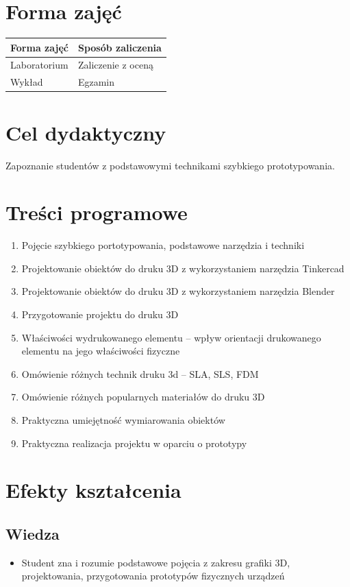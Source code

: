 \documentclass[12pt, a4paper]{article}
\begin{document}
\section{Forma zajęć}

\begin{tabular}{ll}
  \hline
  \textbf{Forma zajęć} & \textbf{Sposób zaliczenia} \\
  \hline
  Laboratorium & Zaliczenie z oceną \\
  Wykład & Egzamin \\
  \hline
\end{tabular}

\section{Cel dydaktyczny}

Zapoznanie studentów z podstawowymi technikami szybkiego prototypowania.

\section{Treści programowe}

\begin{enumerate}
  \item Pojęcie szybkiego portotypowania, podstawowe narzędzia i techniki
  \item Projektowanie obiektów do druku 3D z wykorzystaniem narzędzia Tinkercad
  \item Projektowanie obiektów do druku 3D z wykorzystaniem narzędzia Blender
  \item Przygotowanie projektu do druku 3D
  \item Właściwości wydrukowanego elementu – wpływ orientacji drukowanego elementu na jego właściwości fizyczne
  \item Omówienie różnych technik druku 3d – SLA, SLS, FDM
  \item Omówienie różnych popularnych materiałów do druku 3D
  \item Praktyczna umiejętność wymiarowania obiektów
  \item Praktyczna realizacja projektu w oparciu o prototypy
\end{enumerate}

\section{Efekty kształcenia}

\subsection*{Wiedza}
\begin{itemize}
  \item Student zna i rozumie podstawowe pojęcia z zakresu grafiki 3D, projektowania, przygotowania prototypów fizycznych urządzeń
\end{itemize}
\end{document}
